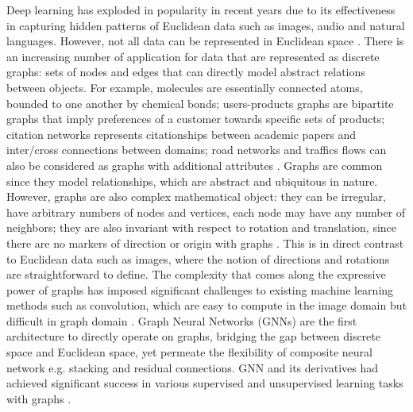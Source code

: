 Deep learning has exploded in popularity in recent years due to its
effectiveness in capturing hidden patterns of Euclidean data such as images,
audio and natural languages. However, not all data can be represented in
Euclidean space \cite{bronsteinGeometricDeepLearning2017}.  There is an
increasing number of application for data that are represented as discrete
graphs: sets of nodes and edges that can directly model abstract relations
between objects. For example, molecules are essentially connected atoms, bounded
to one another by chemical bonds; users-products graphs are bipartite graphs
that imply preferences of a customer towards specific sets of products; citation
networks represents citationships between academic papers and inter/cross
connections between domains; road networks and traffics flows can also be
considered as graphs with additional attributes
\cite{wuComprehensiveSurveyGraph2021}. Graphs are common since they model
relationships, which are abstract and ubiquitous in nature. However, graphs are
also complex mathematical object: they can be irregular, have arbitrary numbers
of nodes and vertices, each node may have any number of neighbors; they are also
invariant with respect to rotation and translation, since there are no markers
of direction or origin with graphs \cite{bronsteinGeometricDeepLearning2017}.
This is in direct contrast to Euclidean data such as images, where the notion of
directions and rotations are straightforward to define. The complexity that
comes along the expressive power of graphs has imposed significant challenges to
existing machine learning methods such as convolution, which are easy to compute
in the image domain but difficult in graph domain
\cite{wuComprehensiveSurveyGraph2021}. Graph Neural Networks (GNNs)
\cite{scarselliGraphNeuralNetwork2009} are the first architecture to directly
operate on graphs, bridging the gap between discrete space and Euclidean space,
yet permeate the flexibility of composite neural network e.g. stacking and
residual connections. GNN and its derivatives had achieved significant success
in various supervised and unsupervised learning tasks with graphs
\cite{kipfSemiSupervisedClassificationGraph2017,
	velickovicGraphAttentionNetworks2018}.


